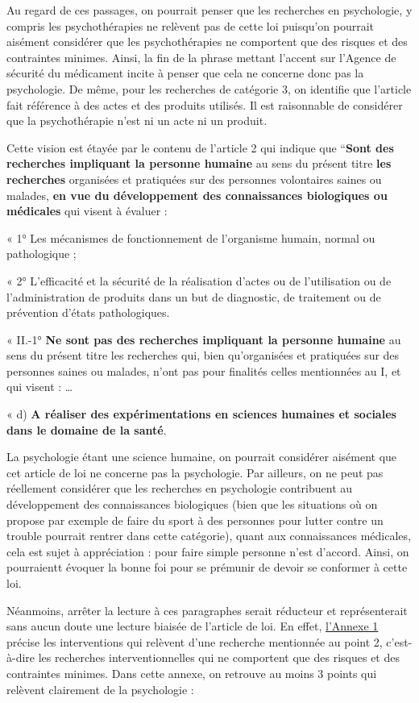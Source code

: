 \documentclass[
  12pt,
]{book}
\begin{document}
Au regard de ces passages, on pourrait penser que les recherches en psychologie, y compris les psychothérapies ne relèvent pas de cette loi puisqu'on pourrait aisément considérer que les psychothérapies ne comportent que des risques et des contraintes minimes. Ainsi, la fin de la phrase mettant l'accent sur l'Agence de sécurité du médicament incite à penser que cela ne concerne donc pas la psychologie. De même, pour les recherches de catégorie 3, on identifie que l'article fait référence à des actes et des produits utilisés. Il est raisonnable de considérer que la psychothérapie n'est ni un acte ni un produit.

Cette vision est étayée par le contenu de l'article 2 qui indique que ``\textbf{Sont des recherches impliquant la personne humaine} au sens du présent titre \textbf{les recherches} organisées et pratiquées sur des personnes volontaires saines ou malades, \textbf{en vue du développement des connaissances biologiques ou médicales} qui visent à évaluer :

« 1° Les mécanismes de fonctionnement de l'organisme humain, normal ou pathologique ;

« 2° L'efficacité et la sécurité de la réalisation d'actes ou de l'utilisation ou de l'administration de produits dans un but de diagnostic, de traitement ou de prévention d'états pathologiques.

« II.-1° \textbf{Ne sont pas des recherches impliquant la personne humaine} au sens du présent titre les recherches qui, bien qu'organisées et pratiquées sur des personnes saines ou malades, n'ont pas pour finalités celles mentionnées au I, et qui visent :
\ldots{}

« d) \textbf{A réaliser des expérimentations en sciences humaines et sociales dans le domaine de la santé}.

La psychologie étant une science humaine, on pourrait considérer aisément que cet article de loi ne concerne pas la psychologie. Par ailleurs, on ne peut pas réellement considérer que les recherches en psychologie contribuent au développement des connaissances biologiques (bien que les situations où on propose par exemple de faire du sport à des personnes pour lutter contre un trouble pourrait rentrer dans cette catégorie), quant aux connaissances médicales, cela est sujet à appréciation : pour faire simple personne n'est d'accord. Ainsi, on pourraientt évoquer la bonne foi pour se prémunir de devoir se conformer à cette loi.

Néanmoins, arrêter la lecture à ces paragraphes serait réducteur et représenterait sans aucun doute une lecture biaisée de l'article de loi. En effet, \href{https://www.legifrance.gouv.fr/loda/id/JORFTEXT000036805796}{l'Annexe 1} précise les interventions qui relèvent d'une recherche mentionnée au point 2, c'est-à-dire les recherches interventionnelles qui ne comportent que des risques et des contraintes minimes. Dans cette annexe, on retrouve au moins 3 points qui relèvent clairement de la psychologie :
\end{document}
